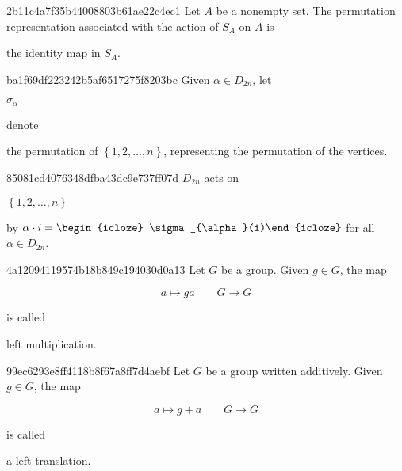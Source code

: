 \begin{note}{2b11c4a7f35b44008803b61ae22c4ec1}
    Let \({ A }\) be a nonempty set.
    The permutation representation associated with the action of \({ S_{A} }\) on \({ A }\) is \begin{icloze}{1}the identity map in \({ S_{A} }\).\end{icloze}
\end{note}

\begin{note}{ba1f69df223242b5af6517275f8203bc}
    Given \({ \alpha \in D_{2n} }\), let \begin{icloze}{2}\({ \sigma_{\alpha} }\)\end{icloze} denote \begin{icloze}{1}the permutation of \({ \left\{ 1, 2, \ldots, n \right\} }\), representing the permutation of the vertices.\end{icloze}
\end{note}

\begin{note}{85081cd4076348dfba43dc9e737ff07d}
    \({ D_{2n} }\) acts on \begin{icloze}{2}\({ \left\{ 1, 2, \ldots, n \right\} }\)\end{icloze} by \({ \alpha \cdot i = \begin{icloze}{1}\sigma_{\alpha}(i)\end{icloze} }\) for all \({ \alpha \in D_{2n} }\).
\end{note}

\begin{note}{4a12094119574b18b849c194030d0a13}
    Let \({ G }\) be a group.
    Given \({ g \in G }\), the map
    \begin{icloze}{2}
        \[
            a \mapsto ga \qquad G \to G
        \]
    \end{icloze}
    is called \begin{icloze}{1}left multiplication.\end{icloze}
\end{note}

\begin{note}{99ec6293e8ff4118b8f67a8ff7d4aebf}
    Let \({ G }\) be a group written additively.
    Given \({ g \in G }\), the map
    \begin{icloze}{2}
        \[
            a \mapsto g + a \qquad G \to G
        \]
    \end{icloze}
    is called \begin{icloze}{1}a left translation.\end{icloze}
\end{note}

